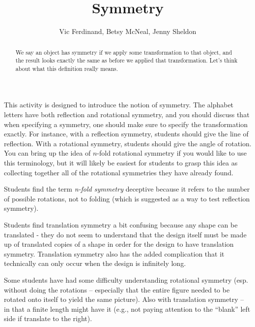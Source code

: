 \documentclass{ximera}
\title{Symmetry}
\author{Vic Ferdinand, Betsy McNeal, Jenny Sheldon}
\begin{document}
\begin{abstract}
We say an object has symmetry if we apply some transformation to that object, and the result looks exactly the same as before we applied that transformation.  Let's think about what this definition really means.
\end{abstract}
\maketitle

\begin{instructorIntro}
This activity is designed to introduce the notion of symmetry.  The alphabet letters have both reflection and rotational symmetry, and you should discuss that when specifying a symmetry, one should make sure to specify the transformation exactly.  For instance, with a reflection symmetry, students should give the line of reflection.  With a rotational symmetry, students should give the angle of rotation.  You can bring up the idea of $n$-fold rotational symmetry if you would like to use this terminology, but it will likely be easiest for students to grasp this idea as collecting together all of the rotational symmetries they have already found.

Students find the term \emph{n-fold symmetry} deceptive because it refers to the number of possible rotations, not to folding (which is suggested as a way to test reflection symmetry).  

Students find translation symmetry a bit confusing because any shape can be translated - they do not seem to understand that the design itself must be made up of translated copies of a shape in order for the design to have translation symmetry.  Translation symmetry also has the added complication that it technically can only occur when the design is infinitely long.

Some students have had some difficulty understanding rotational symmetry (esp. without doing the rotations -- especially that the entire figure needed to be rotated onto itself to yield the same picture).  Also with translation symmetry -- in that a finite length might have it (e.g., not paying attention to the ``blank'' left side if translate to the right).

\end{instructorIntro}
\end{document}
